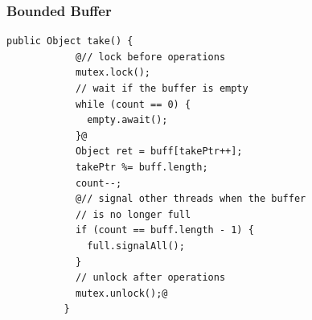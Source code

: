 \documentclass[mathserif,14pt,xcolor=table]{beamer}
\begin{document}



\begin{frame}[fragile]
    \frametitle{Bounded Buffer}
    \begin{lstlisting}[style=base]
          public Object take() {
            @// lock before operations
            mutex.lock();
            // wait if the buffer is empty 
            while (count == 0) {
              empty.await();
            }@
            Object ret = buff[takePtr++];
            takePtr %= buff.length;
            count--;
            @// signal other threads when the buffer 
            // is no longer full
            if (count == buff.length - 1) {
              full.signalAll();
            }
            // unlock after operations
            mutex.unlock();@
          } 
    \end{lstlisting}
\end{frame}
\end{document}
